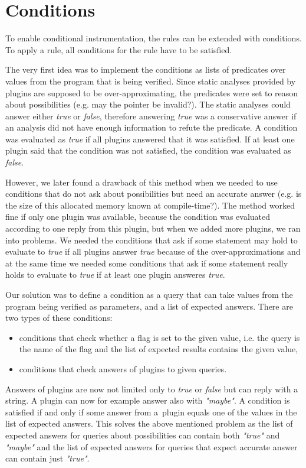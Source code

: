 \section{Conditions}\label{sec:conditions}

To enable conditional instrumentation, the rules can be extended with
conditions. To apply a rule, all conditions for the rule have to be satisfied.

The very first idea was to implement the conditions as lists of predicates over
values from the program that is being verified. Since static analyses provided
by plugins are supposed to be over-approximating, the predicates were set to
reason about possibilities (e.g. may the pointer be invalid?). The static
analyses could answer either \emph{true} or \emph{false}, therefore answering
\emph{true} was a conservative answer if an analysis did not have enough
information to refute the predicate. A condition was evaluated as \emph{true}
if all plugins answered that it was satisfied. If at least one plugin said that
the condition was not satisfied, the condition was evaluated as \emph{false}.

However, we later found a drawback of this method when we needed to use
conditions that do not ask about possibilities but need an accurate answer
(e.g. is the size of this allocated memory known at compile-time?). The method
worked fine if only one plugin was available, because the condition was
evaluated according to one reply from this plugin, but when we added more
plugins, we ran into problems. We needed the conditions that ask if some
statement may hold to evaluate to \emph{true} if all plugins answer
\emph{true} because of the over-approximations and at the same time we needed
some conditions that ask if some statement really holds to evaluate to
\emph{true} if at least one plugin answeres \emph{true}.

Our solution was to define a condition as a query that can take values from the
program being verified as parameters, and a list of expected answers. There are
two types of these conditions:
\begin{itemize}
 \item conditions that check whether a flag is set to the given value, i.e. the
 query is the name of the flag and the list of expected results contains the
 given value,
 \item conditions that check answers of plugins to given queries.
\end{itemize}
Answers of plugins are now not limited only to \emph{true} or \emph{false} but
can reply with a string. A plugin can now for example answer also with
\emph{"maybe"}. A condition is satisfied if and only if some answer from
a~plugin equals one of the values in the list of expected answers. This solves
the above mentioned problem as the list of expected answers for queries about
possibilities can contain both \emph{"true"} and \emph{"maybe"} and the list of
expected answers for queries that expect accurate answer can contain just
\emph{"true"}.


